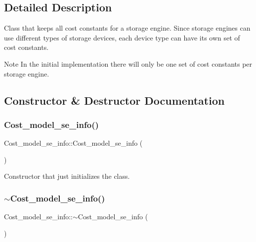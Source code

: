 \subsection{Detailed Description}
Class that keeps all cost constants for a storage engine. Since storage engines can use different types of storage devices, each device type can have its own set of cost constants.

\begin{DoxyNote}{Note}
In the initial implementation there will only be one set of cost constants per storage engine. 
\end{DoxyNote}


\subsection{Constructor \& Destructor Documentation}
\mbox{\label{classCost__model__se__info_ab23a70b0b93eb24f1611be752b0508fa}} 
\subsubsection{\texorpdfstring{Cost\+\_\+model\+\_\+se\+\_\+info()}{Cost\_model\_se\_info()}}
{\footnotesize\ttfamily Cost\+\_\+model\+\_\+se\+\_\+info\+::\+Cost\+\_\+model\+\_\+se\+\_\+info (\begin{DoxyParamCaption}{ }\end{DoxyParamCaption})}

Constructor that just initializes the class. \mbox{\label{classCost__model__se__info_af6efaed0d3ca48042e7001f74b9126a7}} 
\subsubsection{\texorpdfstring{$\sim$\+Cost\+\_\+model\+\_\+se\+\_\+info()}{~Cost\_model\_se\_info()}}
{\footnotesize\ttfamily Cost\+\_\+model\+\_\+se\+\_\+info\+::$\sim$\+Cost\+\_\+model\+\_\+se\+\_\+info (\begin{DoxyParamCaption}{ }\end{DoxyParamCaption})}

